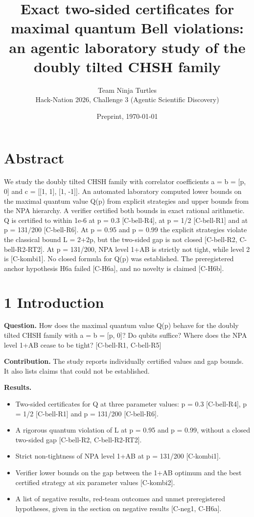 \documentclass[10pt,twocolumn]{article}
\title{\textbf{Exact two-sided certificates for maximal quantum Bell violations: an agentic laboratory study of the doubly tilted CHSH family}}
\author{Team Ninja Turtles\\ \small Hack-Nation 2026, Challenge 3 (Agentic Scientific Discovery)}
\date{Preprint, \today}
\begin{document}
\maketitle
\section{Abstract}

We study the doubly tilted CHSH family with correlator coefficients a = b = [p, 0] and c = [[1, 1], [1, -1]]. An automated laboratory computed lower bounds on the maximal quantum value Q(p) from explicit strategies and upper bounds from the NPA hierarchy. A verifier certified both bounds in exact rational arithmetic. Q is certified to within 1e-6 at p = 0.3 {\scriptsize[C-bell-R4]}, at p = 1/2 {\scriptsize[C-bell-R1]} and at p = 131/200 {\scriptsize[C-bell-R6]}. At p = 0.95 and p = 0.99 the explicit strategies violate the classical bound L = 2+2p, but the two-sided gap is not closed {\scriptsize[C-bell-R2, C-bell-R2-RT2]}. At p = 131/200, NPA level 1+AB is strictly not tight, while level 2 is {\scriptsize[C-kombi1]}. No closed formula for Q(p) was established. The preregistered anchor hypothesis H6a failed {\scriptsize[C-H6a]}, and no novelty is claimed {\scriptsize[C-H6b]}.

\section{1 Introduction}

\textbf{Question.} How does the maximal quantum value Q(p) behave for the doubly tilted CHSH family with a = b = [p, 0]? Do qubits suffice? Where does the NPA level 1+AB cease to be tight? {\scriptsize[C-bell-R1, C-bell-R5]}

\textbf{Contribution.} The study reports individually certified values and gap bounds. It also lists claims that could not be established.

\textbf{Results.}
\begin{itemize}
\item Two-sided certificates for Q at three parameter values: p = 0.3 {\scriptsize[C-bell-R4]}, p = 1/2 {\scriptsize[C-bell-R1]} and p = 131/200 {\scriptsize[C-bell-R6]}.
\item A rigorous quantum violation of L at p = 0.95 and p = 0.99, without a closed two-sided gap {\scriptsize[C-bell-R2, C-bell-R2-RT2]}.
\item Strict non-tightness of NPA level 1+AB at p = 131/200 {\scriptsize[C-kombi1]}.
\item Verifier lower bounds on the gap between the 1+AB optimum and the best certified strategy at six parameter values {\scriptsize[C-kombi2]}.
\item A list of negative results, red-team outcomes and unmet preregistered hypotheses, given in the section on negative results {\scriptsize[C-neg1, C-H6a]}.
\end{itemize}
\end{document}
